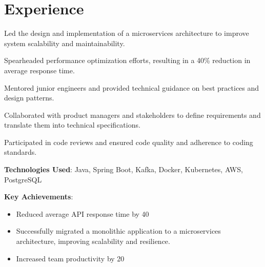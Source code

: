 \documentclass[]{deedy-resume-openfont}
\begin{document}
\begin{minipage}[t]{0.33\textwidth}
%
%

\end{minipage} 
\hfill
\begin{minipage}[t]{0.66\textwidth} 


\section{Experience}
\vspace{\topsep} %
\begin{tightemize}
\item Led the design and implementation of a microservices architecture to improve system scalability and maintainability.
\item Spearheaded performance optimization efforts, resulting in a 40\% reduction in average response time.
\item Mentored junior engineers and provided technical guidance on best practices and design patterns.
\item Collaborated with product managers and stakeholders to define requirements and translate them into technical specifications.
\item Participated in code reviews and ensured code quality and adherence to coding standards.
\item \textbf{Technologies Used}: Java, Spring Boot, Kafka, Docker, Kubernetes, AWS, PostgreSQL
\item \textbf{Key Achievements}:
    \begin{itemize}
        \item Reduced average API response time by 40%
        \item Successfully migrated a monolithic application to a microservices architecture, improving scalability and resilience.
        \item Increased team productivity by 20%
    \end{itemize}
\end{tightemize}
\sectionsep


\end{minipage}
\end{document}
